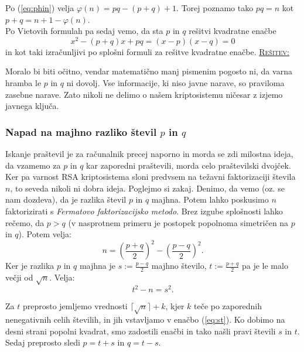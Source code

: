 \documentclass[a4paper, 12pt]{article} %
\newenvironment{matematika}[1]{
\textcolor{bostonuniversityred}{\underline{\textsc{#1:}}}
}{
}
\begin{document}
Po (\ref{eq:phin}) velja $\varphi (n) = pq - (p+q) + 1$. Torej poznamo tako $p q = n$ kot $p + q = n + 1 - \varphi (n)$. \\
Po Vietovih formulah pa sedaj vemo, da sta $p$ in $q$ rešitvi kvadratne enačbe
\begin{equation}
\label{eq:square}
x^2 - (p+q) x + p q = (x - p) (x - q) = 0
\end{equation}
in kot taki izračunljivi po splošni formuli za rešitve kvadratne enačbe.
\newline
\newline
\begin{matematika}{Rešitev}
Moralo bi biti očitno, vendar matematično manj pismenim pogosto ni, da varna hramba le $p$ in $q$ ni dovolj. Vse informacije, ki niso javne narave, so praviloma zasebne narave. Zato nikoli ne delimo o našem kriptosistemu ničesar z izjemo javnega ključa.
\end{matematika}

\subsubsection{Napad na majhno razliko števil $p$ in $q$}

Iskanje praštevil je za računalnik precej naporno in morda se zdi milostna ideja, da vzamemo za $p$ in $q$ kar zaporedni praštevili, morda celo praštevilski dvojček. Ker pa varnost RSA kriptosistema sloni predvsem na težavni faktorizaciji števila $n$, to seveda nikoli ni dobra ideja. Poglejmo si zakaj.
\newline
\newline
Denimo, da vemo (oz. se nam dozdeva), da je razlika števil $p$ in $q$ majhna. Potem lahko poskusimo $n$ faktorizirati s \emph{Fermatovo faktorizacijsko metodo}. Brez izgube splošnosti lahko rečemo, da $p > q$ (v nasprotnem primeru je postopek popolnoma simetričen na $p$ in $q$). Potem velja:
\begin{equation}
\label{eq:ffm}
n = (\frac{p+q}{2})^2 - (\frac{p-q}{2})^2.
\end{equation}
Ker je razlika $p$ in $q$ majhna je $s := \frac{p-q}{2}$ majhno število, $t := \frac{p+q}{2}$ pa je le malo večji od $\sqrt{n}$. Velja:
\begin{equation}
\label{eq:st}
t^2 - n = s^2.
\end{equation}

Za $t$ preprosto jemljemo vrednosti $\lceil \sqrt{n} \rceil + k$, kjer $k$ teče po zaporednih nenegativnih celih številih, in jih vstavljamo v enačbo (\ref{eq:st}). Ko dobimo na desni strani popolni kvadrat, smo zadostili enačbi in tako našli pravi števili $s$ in $t$.
\newline
\newline
Sedaj preprosto sledi $p = t + s$ in $q = t - s$.
\end{document}
